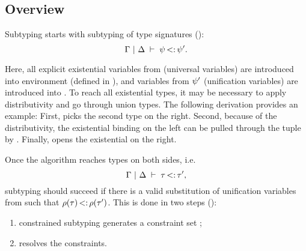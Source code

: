 \subsection{Overview}

Subtyping starts with subtyping of type signatures
():
\[ \Gamma~\vert~\Delta\;\vdash\;\psi \operatorname{<:} \psi'. \]

Here, all explicit existential variables from \tysig (universal variables)
are introduced into environment \AEnv (defined in ), 
and variables from $\psi'$ (unification variables) are introduced into \UEnv.
To reach all existential types, it may be necessary to apply distributivity
and go through union types. The following derivation provides an example:
First,  picks the second type on the right.
Second, because of the distributivity, the existential binding on the left
can be pulled through the tuple by .
Finally,  opens the existential on the right.

Once the algorithm reaches types on both sides,
i.e. \[ \Gamma~\vert~\Delta\;\vdash\;\tau \operatorname{<:} \tau', \]
subtyping should succeed if there is 
a valid substitution \substvars of unification variables from \UEnv
such that $\rho(\tau) \operatorname{<:} \rho(\tau')$.
This is done in two steps ():
\begin{enumerate}
    \item constrained subtyping 
      generates a constraint set \CSet;
    \item \solvectrdflt resolves the constraints.
\end{enumerate}

